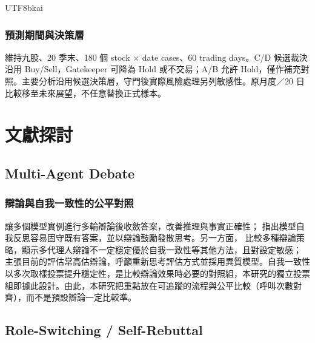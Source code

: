 \documentclass[12pt,a4paper]{article}
\begin{document}
\begin{CJK}{UTF8}{bkai}
\subsubsection{預測期間與決策層}

維持九股、20 季末、180 個 stock $\times$ date cases、60 trading days。C/D 候選裁決沿用 Buy/Sell，Gatekeeper 可降為 Hold 或不交易；A/B 允許 Hold，僅作補充對照。主要分析沿用候選決策層，守門後實際風險處理另列敏感性。原月度／20 日比較移至未來展望，不任意替換正式樣本。

\section{文獻探討}

\subsection{Multi-Agent Debate}

\subsubsection{辯論與自我一致性的公平對照}
\citet{du2023debate} 讓多個模型實例進行多輪辯論後收斂答案，改善推理與事實正確性；\citet{liang2023divergent} 指出模型自我反思容易固守既有答案，並以辯論鼓勵發散思考。另一方面，\citet{smit2023mad} 比較多種辯論策略，顯示多代理人辯論不一定穩定優於自我一致性等其他方法，且對設定敏感；\citet{zhang2025stop} 主張目前的評估常高估辯論，呼籲重新思考評估方式並採用異質模型。自我一致性 \citep{wang2023selfconsistency} 以多次取樣投票提升穩定性，是比較辯論效果時必要的對照組，本研究的獨立投票組即據此設計。由此，本研究把重點放在可追蹤的流程與公平比較（呼叫次數對齊），而不是預設辯論一定比較準。
\subsection{Role-Switching / Self-Rebuttal}


\end{CJK}
\end{document}
